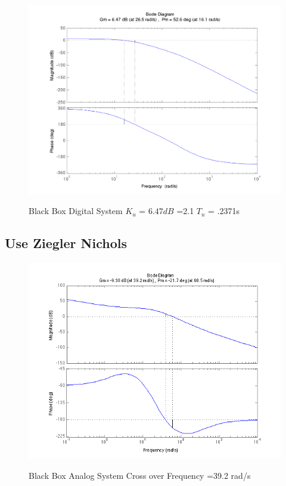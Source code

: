 \documentclass[english]{article}
\begin{document}
\begin{figure}[h!]
\caption{Black Box Digital System $K_u$ = $6.47dB$ =2.1 $T_u$ = .2371s} 
\includegraphics[width = \linewidth]{part4_digital.png}
\label{fig:4_a2}
\end{figure}
\FloatBarrier 

\subsection*{Use Ziegler Nichols}

\begin{figure}[h!]
\caption{Black Box Analog System Cross over Frequency =39.2 rad/s} 
\includegraphics[width = \linewidth]{4b_analog.png}
\label{fig:4_b1}
\end{figure}
\end{document}
